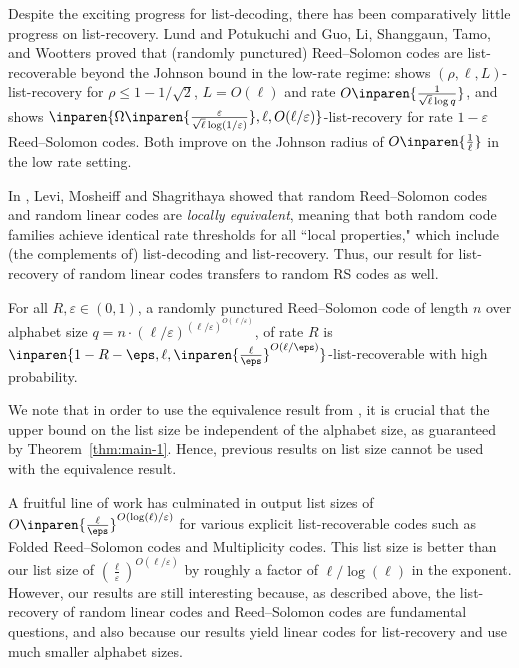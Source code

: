 \documentclass{article}
\begin{document}
Despite the exciting progress for list-decoding, there has been comparatively little progress on list-recovery.
Lund and Potukuchi \cite{lund2020list} and Guo, Li, Shanggaun, Tamo, and Wootters \cite{guo2022improved} proved that (randomly punctured) Reed--Solomon codes are list-recoverable beyond the Johnson bound in the low-rate regime: \cite{lund2020list} shows $(\rho,\ell,L)$-list-recovery for $\rho\le 1-1/\sqrt{2}$, $L=O(\ell)$ and rate $O\inparen{\frac{1}{\sqrt{\ell}\log q}}$, and \cite{guo2022improved} shows $\inparen{\Omega\inparen{\frac{\varepsilon}{\sqrt{\ell}\log(1/\varepsilon)}},\ell, O(\ell/\varepsilon) }$-list-recovery for rate $1-\varepsilon$ Reed--Solomon codes.
Both improve on the Johnson radius of $O\inparen{\frac{1}{\ell} }$ in the low rate setting.

In \cite{levi2024random}, Levi, Mosheiff and Shagrithaya showed that random Reed--Solomon codes and random linear codes are \emph{locally equivalent}, meaning that both random code families achieve identical rate thresholds for all ``local properties," which include (the complements of) list-decoding and list-recovery.
Thus, our result for list-recovery of random linear codes transfers to random RS codes as well. 
\begin{theorem}
    For all $R,\varepsilon\in(0,1)$, a randomly punctured Reed--Solomon code of length $n$ over alphabet size $q=n\cdot (\ell/\varepsilon)^{(\ell/\varepsilon)^{O(\ell/\varepsilon)}}$, of rate $R$ is $\inparen{1-R-\eps, \ell, \inparen{\frac{\ell}{\eps}}^{O(\ell/\eps)}}$-list-recoverable with high probability.
    \label{thm:main-2}
\end{theorem}

\begin{remark}
    We note that in order to use the equivalence result from \cite{levi2024random}, it is crucial that the upper bound on the list size be independent of the alphabet size, as guaranteed by Theorem~\ref{thm:main-1}. Hence, previous results on list size cannot be used with the equivalence result.
    \label{rem:main-2}
\end{remark}

\begin{remark}
    A fruitful line of work \cite{guruswami2008explicit,kopparty2015listdecoding,guruswami2013linearalgebraic,dvir2012subspace,kopparty2018improved,tamo2023tighter} has culminated in output list sizes of $O\inparen{\frac{\ell}{\eps}}^{O(\log(\ell)/\varepsilon)}$ for various explicit list-recoverable codes such as Folded Reed--Solomon codes and Multiplicity codes. 
    This list size is better than our list size of $(\frac{\ell}{\varepsilon})^{O(\ell/\varepsilon)}$ by roughly a factor of $\ell/\log(\ell)$ in the exponent.
    However, our results are still interesting because, as described above, the list-recovery of random linear codes and Reed--Solomon codes are fundamental questions, and also because our results yield linear codes for list-recovery and use much smaller alphabet sizes.
\end{remark}
\end{document}
